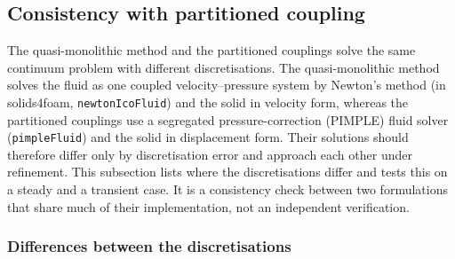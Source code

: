 \subsection{Consistency with partitioned coupling}\label{sec:consistency_partitioned}

The quasi-monolithic method and the partitioned couplings solve the same continuum problem with different discretisations.
The quasi-monolithic method solves the fluid as one coupled velocity--pressure system by Newton's method (in solids4foam, \texttt{newtonIcoFluid}) and the solid in velocity form, whereas the partitioned couplings use a segregated pressure-correction (PIMPLE) fluid solver (\texttt{pimpleFluid}) and the solid in displacement form.
Their solutions should therefore differ only by discretisation error and approach each other under refinement.
This subsection lists where the discretisations differ and tests this on a steady and a transient case.
It is a consistency check between two formulations that share much of their implementation, not an independent verification.

\subsubsection{Differences between the discretisations}\label{sec:fluid_differences}

